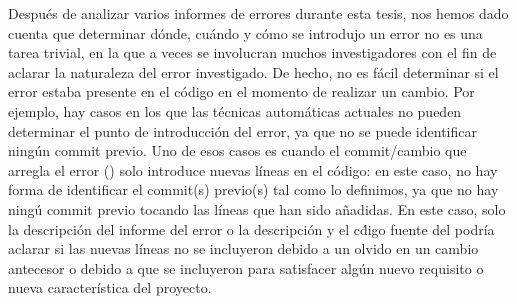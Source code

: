 \documentclass[a4paper, 12pt]{book}
\begin{document}
Despu\'es de analizar varios informes de errores durante esta tesis, nos hemos dado cuenta que determinar d\'onde, cu\'ando y c\'omo se introdujo un error no es una tarea trivial, en la que a veces se involucran muchos investigadores con el fin de aclarar la naturaleza del error investigado. De hecho, no es f\'acil determinar si el error estaba presente en el c\'odigo en el momento de realizar un cambio. Por ejemplo, hay casos en los que las t\'ecnicas autom\'aticas actuales no pueden determinar el punto de introducci\'on del error, ya que no se puede identificar ning\'un commit previo. Uno de esos casos es cuando el commit/cambio que arregla el error (\BFC) solo introduce nuevas l\'ineas en el c\'odigo: en este caso, no hay forma de identificar el commit(s) previo(s) tal como lo definimos, ya que no hay ning\'u commit previo tocando las l\'ineas que han sido a\~nadidas. En este caso, solo la descripci\'on del informe del error o la descripci\'on y el c\'digo fuente del \BFC podr\'ia aclarar si las nuevas l\'ineas no se incluyeron debido a un olvido en un cambio antecesor o debido a que se incluyeron para satisfacer alg\'un nuevo requisito o nueva caracter\'istica del proyecto.
\end{document}
